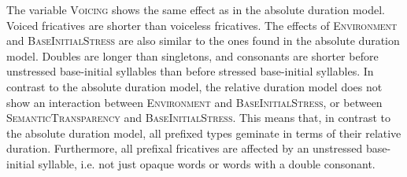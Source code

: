     \begin{table}
    	\caption{ Summary of linear model for variables predicting the relative  duration of [s] in prefixed words}
    	\label{tbl: summary model5}
    	
    	
    \end{table}
  
The variable \textsc{Voicing} shows the same effect as in the absolute duration model. Voiced fricatives are shorter than voiceless fricatives.
The effects of \textsc{Environment} and \textsc{BaseInitialStress} are also similar to the ones found in the absolute duration model. Doubles are longer than singletons, and consonants are shorter before unstressed base-initial syllables than before stressed base-initial syllables. 
In contrast to the absolute duration model, the relative duration model does not show an interaction between \textsc{Environment} and \textsc{BaseInitialStress}, or between \textsc{SemanticTransparency} and \textsc{BaseInitialStress}. This means that, in contrast to the absolute duration model,  all prefixed types geminate in terms of their relative duration. Furthermore, all prefixal fricatives are affected by an unstressed base-initial syllable, i.e. not just opaque words or words with a double consonant.

